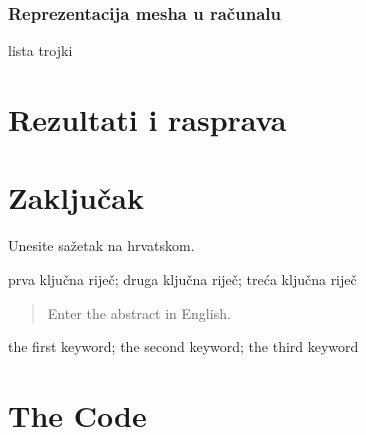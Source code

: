 \documentclass[zavrsnirad]{../fer}
\begin{document}
\subsection{Reprezentacija mesha u računalu}
lista trojki
\chapter{Rezultati i rasprava}
\label{pog:rezultati_i_rasprava}



\chapter{Zaključak}
\label{pog:zakljucak}









\begin{sazetak}
	Unesite sažetak na hrvatskom.

\end{sazetak}

\begin{kljucnerijeci}
	prva ključna riječ; druga ključna riječ; treća ključna riječ
\end{kljucnerijeci}


\begin{abstract}
	Enter the abstract in English.

\end{abstract}

\begin{keywords}
	the first keyword; the second keyword; the third keyword
\end{keywords}



\backmatter

\chapter{The Code}
\end{document}
